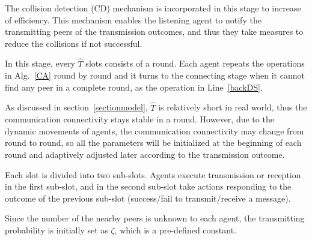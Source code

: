 The collision detection (CD) mechanism is incorporated in this stage 
to increase of efficiency. This mechanism enables the listening agent 
to notify the transmitting peers of the transmission outcomes, 
and thus they take measures to reduce the collisions if not successful.

In this stage, every $\hat{T}$ slots consists of a round. Each 
agent repeats the operations in Alg.~\ref{CA} round by round and 
it turns to the connecting stage when it cannot find any peer in a complete round, 
as the operation in Line~\ref{backDS}.

As discussed in section~\ref{sectionmodel}, $\hat{T}$ is relatively short in 
real world, thus the communication connectivity stays stable in a round. 
However, due to the dynamic movements of agents, the communication connectivity
may change from round to round, so all the parameters will be 
initialized at the beginning of each round and adaptively adjusted later 
according to the transmission outcome.

Each slot is divided into two sub-slots.
Agents execute transmission or reception in the first sub-slot, 
and in the second sub-slot take actions responding to the outcome of the previous sub-slot
(success/fail to transmit/receive a message).

Since the number of the nearby peers is unknown to each agent, 
the transmitting probability is initially set as $\zeta$, which is a pre-defined constant.

